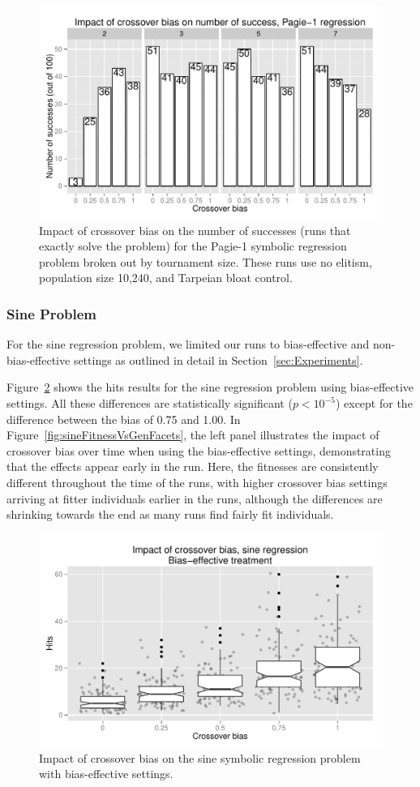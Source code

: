 \documentclass{sig-alternate}
\begin{document}
\begin{figure}
\centering
\includegraphics[width=0.45 \textwidth]{Plots/Pagie_1_Strong_Successes_vs_Bias.pdf}
\caption{Impact of crossover bias on the number of successes (runs that exactly solve the problem) for the Pagie-1
symbolic regression problem broken out by tournament size. These runs use 
no elitism, population size 10,240, and Tarpeian bloat control.}
\label{fig:Pagie1StrongSuccesses}
\end{figure}

\subsubsection{Sine Problem}
\label{sec:sineRegression}

For the sine regression problem, we limited our runs to bias-effective and non-bias-effective settings as outlined in
detail in Section~\ref{sec:Experiments}.

Figure~\ref{fig:sineBiasResultsStrong} shows the hits results for the sine regression problem using bias-effective
settings. All these differences are statistically significant ($p < 10^{-5}$) except for the difference between the
bias of 0.75 and 1.00. In Figure~\ref{fig:sineFitnessVsGenFacets}, the left panel illustrates the impact of crossover
bias over time when using the bias-effective settings, demonstrating that the effects appear early in the run. Here,
the fitnesses are consistently different throughout the time of the runs, with higher crossover bias settings arriving
at fitter individuals earlier in the runs, although the differences are shrinking towards the end as many runs find
fairly fit individuals.

\begin{figure}
\centering
\includegraphics[width=0.45 \textwidth]{Plots/Sine_XO_impact_strong_boxplot.pdf}
\caption{Impact of crossover bias on the sine symbolic regression problem with bias-effective settings.}
\label{fig:sineBiasResultsStrong}
\end{figure}
\end{document}

